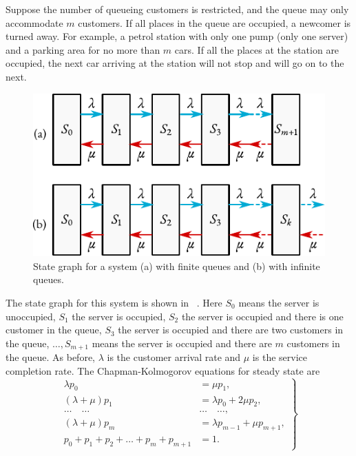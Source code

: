  Suppose	the	number of queueing customers is restricted, and the queue may only accommodate $m$ customers. If all places in the queue are occupied, a newcomer is turned away. For example, a petrol station with only one pump (only one server) and a parking area for no more than $m$ cars. If all the places at the station are occupied, the next car arriving at the station will not stop and will go on to the next.
 \begin{figure}[!h]
 \centering
 \includegraphics[width=0.75\tfwidth]{figures/state-graph4.pdf}
\caption{State graph for a system (a) with finite queues and (b) with infinite queues.\label{state-graph4}}
 \end{figure}
The state graph for this system is shown in ~. Here $S_{0}$ means the server is unoccupied, $S_{1}$  the server is occupied, $S_{2}$  the server is occupied and there is one customer in the queue, $S_{3}$ the server is occupied and there are two customers in the queue, $\ldots{}, S_{m+1}$ means the server is occupied and there are $m$ customers in the queue. As before, $\lambda$ is the customer arrival rate and $\mu$ is the service completion rate. The Chapman-Kolmogorov equations for steady state are
\begin{equation}%
\left.
\begin{split}
\lambda p_{0} & = \mu p_{1},\\
(\lambda + \mu) p_{1} & = \lambda p_{0} + 2\mu p_{2},\\
\ldots{} \quad \ldots{} \quad & \ldots{} \quad \ldots{} , \\
(\lambda + \mu) p_{m} & = \lambda p_{m-1} + \mu p_{m+1},\\
p_{0} + p_{1} + p_{2} + \ldots + p_{m} + p_{m+1} & = 1.
\end{split}
\right\}
\label{eq-2.7}
\end{equation}
